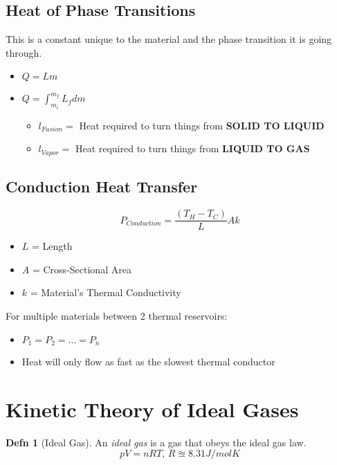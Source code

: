 \documentclass[10pt,letterpaper,final,twoside,notitlepage]{article}
\numberwithin{equation}{section} %
\theoremstyle{definition}
\newtheorem{definition}{Defn}
\theoremstyle{remark}
\begin{document}
	\subsection*{Heat of Phase Transitions} \label{subec:Heat Phase Transitions}
	This is a constant unique to the material and the phase transition it is going through.
	\begin{itemize}[nolistsep]
		\item $Q = Lm$
		\item $Q = \int_{m_{i}}^{m_{f}} L_{f} dm$
		\begin{itemize}[noitemsep, nolistsep]
			\item $l_{Fusion} = $ Heat required to turn things from \textbf{SOLID TO LIQUID}
			\item $l_{Vapor} = $ Heat required to turn things from \textbf{LIQUID TO GAS}
		\end{itemize}
	\end{itemize}

	\subsection*{Conduction Heat Transfer} \label{subsec:Conduction Heat Transfer}
	\begin{equation} \label{eq:Conduction Heat Transfer}
		P_{Conduction} = \frac{\left( T_{H} - T_{C} \right)}{L} Ak
	\end{equation}
		\begin{itemize}[noitemsep, nolistsep]
			\item $L$ = Length
			\item $A$ = Cross-Sectional Area
			\item $k$ = Material's Thermal Conductivity
		\end{itemize}
	For multiple materials between 2 thermal reservoirs:
	\begin{itemize}[noitemsep, nolistsep]
		\item $P_{1} = P_{2} = \ldots = P_{n}$
		\item Heat will only flow as fast as the slowest thermal conductor
	\end{itemize}

\section{Kinetic Theory of Ideal Gases} \label{sec:Kinetic Theory of Ideal Gases}
	\begin{definition}[Ideal Gas] \label{def:Ideal Gas}
		An \emph{ideal gas} is a gas that obeys the ideal gas law.
		\begin{equation} \label{eq:Ideal Gas Law}
			pV = nRT \text{, } R \approxeq 8.31 J/mol K
		\end{equation}
	\end{definition}
\end{document}
